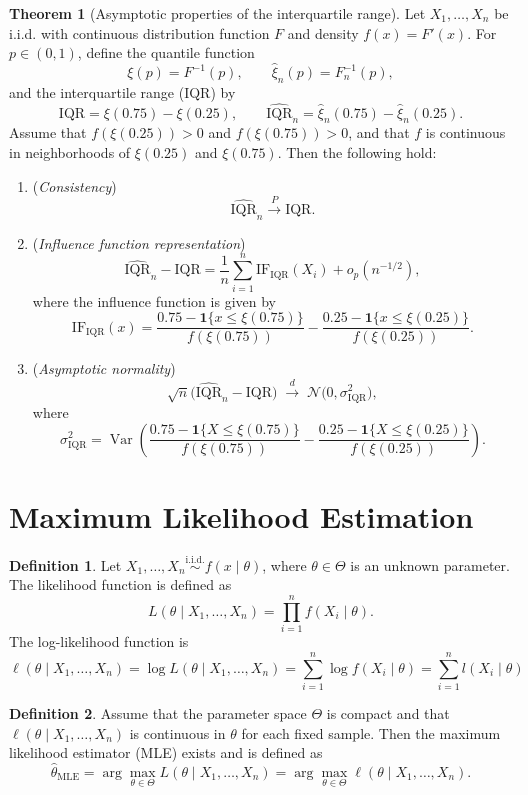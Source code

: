 \documentclass[11pt]{article}
\theoremstyle{definition}
\newtheorem{defn}{Definition}[section]
\newtheorem{theo}{Theorem}[section]
\begin{document}
\begin{theo}[Asymptotic properties of the interquartile range]
Let $X_1,\dots,X_n$ be i.i.d. with continuous distribution function $F$ and density 
$f(x) = F'(x)$. For $p \in (0,1)$, define the quantile function
\[
\xi(p) = F^{-1}(p),
\qquad 
\hat{\xi}_n(p) = F_n^{-1}(p),
\]
and the interquartile range (IQR) by
\[
\mathrm{IQR} = \xi(0.75) - \xi(0.25), 
\qquad 
\widehat{\mathrm{IQR}}_n = \hat{\xi}_n(0.75) - \hat{\xi}_n(0.25).
\]
Assume that $f(\xi(0.25)) > 0$ and $f(\xi(0.75)) > 0$, and that $f$ is continuous in neighborhoods 
of $\xi(0.25)$ and $\xi(0.75)$. Then the following hold:
\begin{enumerate}
\item (\emph{Consistency}) 
\[
\widehat{\mathrm{IQR}}_n \xrightarrow{P} \mathrm{IQR}.
\]

\item (\emph{Influence function representation})
\[
\widehat{\mathrm{IQR}}_n - \mathrm{IQR}
=
\frac{1}{n} \sum_{i=1}^n \mathrm{IF}_{\mathrm{IQR}}(X_i)
+ o_p(n^{-1/2}),
\]
where the influence function is given by
\[
\mathrm{IF}_{\mathrm{IQR}}(x)
=
\frac{0.75 - \mathbf{1}\{x \le \xi(0.75)\}}{f(\xi(0.75))}
-
\frac{0.25 - \mathbf{1}\{x \le \xi(0.25)\}}{f(\xi(0.25))}.
\]

\item (\emph{Asymptotic normality})
\[
\sqrt{n}\big(\widehat{\mathrm{IQR}}_n - \mathrm{IQR}\big)
\;\xrightarrow{d}\;
\mathcal{N}\big(0, \sigma^2_{\mathrm{IQR}}\big),
\]
where
\[
\sigma^2_{\mathrm{IQR}}
=
\operatorname{Var}\!\left(
\frac{0.75 - \mathbf{1}\{X \le \xi(0.75)\}}{f(\xi(0.75))}
-
\frac{0.25 - \mathbf{1}\{X \le \xi(0.25)\}}{f(\xi(0.25))}
\right).
\]
\end{enumerate}
\end{theo}
\newpage
\section{Maximum Likelihood Estimation}
\begin{defn}
    Let \(X_1, \dots, X_n \overset{\text{i.i.d.}}{\sim} f(x \mid \theta)\), where \(\theta \in \Theta\) is an unknown parameter.
The likelihood function is defined as
\[
L(\theta \mid X_1, \dots, X_n)
= \prod_{i=1}^n f(X_i \mid \theta).
\]
The log-likelihood function is
\[
\ell(\theta \mid X_1, \dots, X_n)
= \log L(\theta \mid X_1, \dots, X_n)
= \sum_{i=1}^n \log f(X_i \mid \theta) = \sum_{i=1}^n l(X_i \mid \theta)
\]
\end{defn}
\begin{defn}
    Assume that the parameter space \(\Theta\) is compact and that
\(\ell(\theta \mid X_1, \dots, X_n)\) is continuous in \(\theta\) for each fixed sample.
Then the maximum likelihood estimator (MLE) exists and is defined as
\[
\hat{\theta}_{\mathrm{MLE}}
= \arg\max_{\theta \in \Theta} L(\theta \mid X_1, \dots, X_n)
= \arg\max_{\theta \in \Theta} \ell(\theta \mid X_1, \dots, X_n).
\]
\end{defn}
\end{document}
